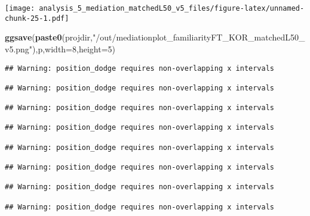 \documentclass[
]{article}
\newenvironment{Shaded}{\begin{snugshade}}{\end{snugshade}}
\newcommand{\DataTypeTok}[1]{\textcolor[rgb]{0.13,0.29,0.53}{#1}}
\newcommand{\DecValTok}[1]{\textcolor[rgb]{0.00,0.00,0.81}{#1}}
\newcommand{\KeywordTok}[1]{\textcolor[rgb]{0.13,0.29,0.53}{\textbf{#1}}}
\newcommand{\NormalTok}[1]{#1}
\newcommand{\StringTok}[1]{\textcolor[rgb]{0.31,0.60,0.02}{#1}}
\begin{document}
\texttt{[image: analysis\_5\_mediation\_matchedL50\_v5\_files/figure-latex/unnamed-chunk-25-1.pdf]}

\begin{Shaded}
\begin{Highlighting}[]
\KeywordTok{ggsave}\NormalTok{(}\KeywordTok{paste0}\NormalTok{(projdir,}\StringTok{"/out/mediationplot_familiarityFT_KOR_matchedL50_v5.png"}\NormalTok{),p,}\DataTypeTok{width=}\DecValTok{8}\NormalTok{,}\DataTypeTok{height=}\DecValTok{5}\NormalTok{)}
\end{Highlighting}
\end{Shaded}

\begin{verbatim}
## Warning: position_dodge requires non-overlapping x intervals

## Warning: position_dodge requires non-overlapping x intervals

## Warning: position_dodge requires non-overlapping x intervals

## Warning: position_dodge requires non-overlapping x intervals

## Warning: position_dodge requires non-overlapping x intervals

## Warning: position_dodge requires non-overlapping x intervals

## Warning: position_dodge requires non-overlapping x intervals

## Warning: position_dodge requires non-overlapping x intervals
\end{verbatim}
\end{document}
